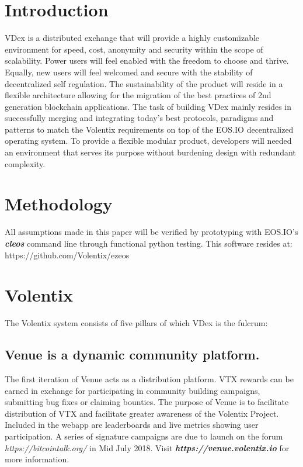 \documentclass[]{article}
\begin{document}
\section{Introduction}

VDex is a distributed exchange that will provide a highly customizable environment for speed, cost, anonymity and security within the scope of scalability. 
Power users will feel enabled with the freedom to choose and thrive. 
Equally, new users will feel welcomed and secure with the stability of decentralized self regulation. 
The sustainability of the product will reside in a flexible architecture 
allowing for the migration of the best practices of 2nd generation blockchain applications.  
The task of building VDex mainly resides in successfully merging
and integrating today's best protocols, paradigms and patterns to match the 
Volentix requirements on top of the EOS.IO decentralized operating system.
To provide a flexible modular product, developers will needed an environment that serves its purpose without burdening design with redundant complexity. 
 	
\section{Methodology}

All assumptions made in this paper will be verified by prototyping
with EOS.IO's \textbf{\textit{cleos}} command line through functional python testing. This software resides at: https://github.com/Volentix/ezeos

\section{Volentix}	
The Volentix system consists of five pillars of which VDex is the fulcrum:

\subsection {Venue is a dynamic community platform. \\}

The first iteration of Venue acts as a distribution platform. 
VTX rewards can be earned in exchange for participating in community building campaigns, submitting bug fixes or claiming bounties. 
The purpose of Venue is to facilitate distribution of VTX and facilitate greater awareness of the Volentix Project. 
Included in the webapp are leaderboards and live metrics showing user participation. 
A series of signature campaigns are due to launch on the forum \textit{https://bitcointalk.org/} in Mid July 2018. 
Visit \textbf{\textit{https://venue.volentix.io}} for more information. 
	
\end{document}

